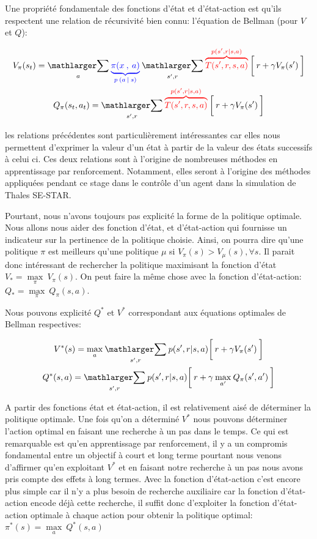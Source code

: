 Une propriété fondamentale des fonctions d'état et d'état-action est qu'ils respectent une relation de récursivité bien connu: l'équation de Bellman (pour $V$ et $Q$):

\begin{gather}
V_\pi(s_t) = \underset{a}{\bsum}\: \policyc{blue} \:\underset{s', r}{\bsum}\:\dynamicsc{red}\: \bigg[\: r + \gamma V_\pi(s') \:\bigg] \\
Q_\pi(s_t, a_t) = \underset{s', r}{\bsum}\:\dynamicsc{red}\: \bigg[\: r + \gamma V_\pi(s') \:\bigg] 
\end{gather}

\bigskip

les relations précédentes sont particulièrement intéressantes car elles nous permettent d'exprimer la valeur d'un état à partir de la valeur des états successifs à celui ci. Ces deux relations sont à l'origine de nombreuses méthodes en apprentissage par renforcement. Notamment, elles seront à l'origine des méthodes appliquées pendant ce stage dans le contrôle d'un agent dans la simulation de Thales SE-STAR.

Pourtant, nous n'avons toujours pas explicité la forme de la politique optimale. Nous allons nous aider des fonction d'état, et d'état-action qui fournisse un indicateur sur la pertinence de la politique choisie. Ainsi, on pourra dire qu'une politique $\pi$ est meilleurs qu'une politique $\mu$ si $V_\pi(s) > V_\mu(s), \forall s $. Il parait donc intéressant de rechercher la politique maximisant la fonction d'état $ V_* = \underset{\pi}{\max} \:V_\pi(s) $. On peut faire la même chose avec la fonction d'état-action: $ Q_* = \underset{\pi}{\max} \:Q_\pi(s, a) $.

Nous pouvons explicité $Q^*$ et $V^*$ correspondant aux équations optimales de Bellman respectives:

\begin{gather}
V^*(s) = \underset{a}{\max} \: \underset{s', r}{\bsum} \: p(s',r \vert s, a) \bigg[\: r + \gamma V_\pi(s') \:\bigg]
\\
Q^*(s, a) = \underset{s', r}{\bsum} \: p(s',r \vert s, a) \bigg[\: r + \gamma \: \underset{a'}{\max} \: Q_\pi(s', a') \:\bigg]
\end{gather}
\bigskip


A partir des fonctions état et état-action, il est relativement aisé de déterminer la politique optimale. Une fois qu'on a déterminé $V^*$ nous pouvons déterminer l'action optimal en faisant une recherche à un pas dans le temps. Ce qui est remarquable est qu'en apprentissage par renforcement, il y a un compromis fondamental entre un objectif à court et long terme pourtant nous venons d'affirmer qu'en exploitant $V^*$ et en faisant notre recherche à un pas nous avons pris compte des effets à long termes. Avec la fonction d'état-action c'est encore plus simple car il n'y a plus besoin de recherche auxiliaire car la fonction d'état-action encode déjà cette recherche, il suffit donc d'exploiter la fonction d'état-action optimale à chaque action pour obtenir la politique optimal: $\pi^*(s) = \underset{a}{\max}\:Q^*(s,a)$ 

